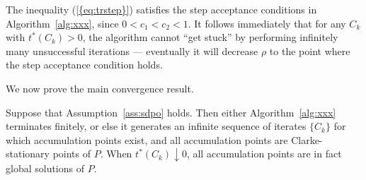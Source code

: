 \documentclass{siamltex}
\begin{document}
The inequality {(\ref{{eq:trstep}})} satisfies the step acceptance
conditions in Algorithm~\ref{alg:xxx}, since $0<c_1<c_2<1$. It follows
immediately that for any $C_k$ with $t^*(C_k)>0$, the algorithm cannot
``get stuck'' by performing infinitely many unsuccessful iterations
--- eventually it will decrease $\rho$ to the point where the step
acceptance condition holds.

We now prove the main convergence result.
\begin{theorem} \label{th:conv} Suppose that Assumption~\ref{ass:sdpo}
  holds. Then either Algorithm~\ref{alg:xxx} terminates finitely, or
  else it generates an infinite sequence of iterates $\{ C_k \}$ for
  which accumulation points exist, and all accumulation points are
  Clarke-stationary points of $P$. When $t^*(C_k) \downarrow 0$, all
  accumulation points are in fact global solutions of $P$.
\end{theorem}
\end{document}
